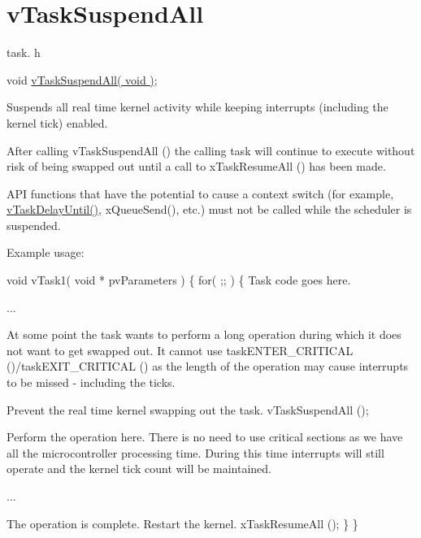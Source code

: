 \hypertarget{group__v_task_suspend_all}{\section{v\-Task\-Suspend\-All}
\label{group__v_task_suspend_all}
}
task. h 
\begin{DoxyPre}void \hyperlink{win32_2win32_2_libraries_2_free_r_t_o_s_2_source_2tasks_8c_a084d232640bd1d04bcac0b8784417015}{vTaskSuspendAll( void )};\end{DoxyPre}


Suspends all real time kernel activity while keeping interrupts (including the kernel tick) enabled.

After calling v\-Task\-Suspend\-All () the calling task will continue to execute without risk of being swapped out until a call to x\-Task\-Resume\-All () has been made.

A\-P\-I functions that have the potential to cause a context switch (for example, \hyperlink{_common_2_libraries_2_free_r_t_o_s_2_source_2include_2task_8h_a3033ef5b1abc8618ea205d1082b21bb6}{v\-Task\-Delay\-Until()}, x\-Queue\-Send(), etc.) must not be called while the scheduler is suspended.

Example usage\-: 
\begin{DoxyPre}
 void vTask1( void * pvParameters )
 \{
         for( ;; )
         \{
Task code goes here.\end{DoxyPre}



\begin{DoxyPre}...\end{DoxyPre}



\begin{DoxyPre}At some point the task wants to perform a long operation during
which it does not want to get swapped out.  It cannot use
taskENTER\_CRITICAL ()/taskEXIT\_CRITICAL () as the length of the
operation may cause interrupts to be missed - including the
ticks.\end{DoxyPre}



\begin{DoxyPre}Prevent the real time kernel swapping out the task.
                 vTaskSuspendAll ();\end{DoxyPre}



\begin{DoxyPre}Perform the operation here.  There is no need to use critical
sections as we have all the microcontroller processing time.
During this time interrupts will still operate and the kernel
tick count will be maintained.\end{DoxyPre}



\begin{DoxyPre}...\end{DoxyPre}



\begin{DoxyPre}The operation is complete.  Restart the kernel.
                 xTaskResumeAll ();
         \}
 \}
   \end{DoxyPre}
 